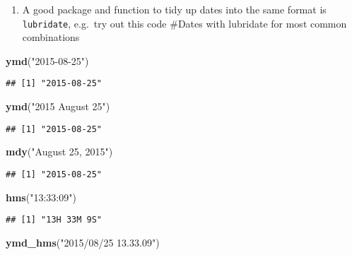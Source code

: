 \documentclass[]{article}
\newenvironment{Shaded}{\begin{snugshade}}{\end{snugshade}}
\newcommand{\KeywordTok}[1]{\textcolor[rgb]{0.13,0.29,0.53}{\textbf{#1}}}
\newcommand{\StringTok}[1]{\textcolor[rgb]{0.31,0.60,0.02}{#1}}
\newcommand{\NormalTok}[1]{#1}
\providecommand{\tightlist}{%
  \setlength{\itemsep}{0pt}\setlength{\parskip}{0pt}}
\begin{document}
\begin{enumerate}
\def\labelenumi{\arabic{enumi}.}
\setcounter{enumi}{4}
\tightlist
\item
  A good package and function to tidy up dates into the same format is
  \texttt{lubridate}, e.g.~try out this code \#Dates with lubridate for
  most common combinations
\end{enumerate}

\begin{Shaded}
\begin{Highlighting}[]
\KeywordTok{ymd}\NormalTok{(}\StringTok{"2015-08-25"}\NormalTok{)}
\end{Highlighting}
\end{Shaded}

\begin{verbatim}
## [1] "2015-08-25"
\end{verbatim}

\begin{Shaded}
\begin{Highlighting}[]
\KeywordTok{ymd}\NormalTok{(}\StringTok{"2015 August 25"}\NormalTok{)}
\end{Highlighting}
\end{Shaded}

\begin{verbatim}
## [1] "2015-08-25"
\end{verbatim}

\begin{Shaded}
\begin{Highlighting}[]
\KeywordTok{mdy}\NormalTok{(}\StringTok{"August 25, 2015"}\NormalTok{)}
\end{Highlighting}
\end{Shaded}

\begin{verbatim}
## [1] "2015-08-25"
\end{verbatim}

\begin{Shaded}
\begin{Highlighting}[]
\KeywordTok{hms}\NormalTok{(}\StringTok{"13:33:09"}\NormalTok{)}
\end{Highlighting}
\end{Shaded}

\begin{verbatim}
## [1] "13H 33M 9S"
\end{verbatim}

\begin{Shaded}
\begin{Highlighting}[]
\KeywordTok{ymd_hms}\NormalTok{(}\StringTok{"2015/08/25 13.33.09"}\NormalTok{)}
\end{Highlighting}
\end{Shaded}
\end{document}
